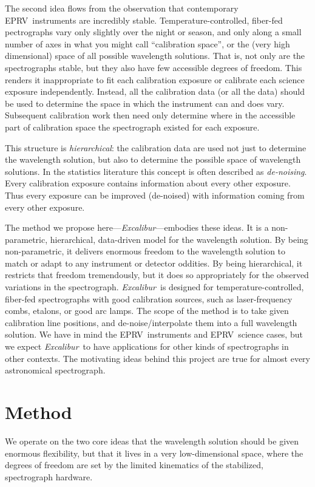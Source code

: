 \documentclass[twocolumn]{aastex63}
\newcommand{\project}[1]{\textsl{#1}}
\newcommand{\name}{\project{Excalibur}}
\newcommand{\acronym}[1]{{\small{#1}}}
\newcommand{\eprv}{\acronym{EPRV}}
\begin{document}
The second idea flows from the observation that contemporary
\eprv\ instruments are incredibly stable.
Temperature-controlled, fiber-fed pectrographs vary only slightly over the night or season, and only along a small number of axes in what you might call ``calibration space'', or the (very high dimensional) space of all possible wavelength solutions.
That is, not only are the spectrographs stable, but they also have few accessible degrees of freedom.
This renders it inappropriate to fit each calibration exposure or calibrate each science exposure independently.
Instead, all the calibration data (or all the data) should be used to determine the space in which the instrument can and does vary.  Subsequent calibration work then need only determine where in the accessible part of calibration space the spectrograph existed for each exposure.

This structure is \emph{hierarchical}: the calibration data are used not just to determine the wavelength solution, but also to determine the possible space of wavelength solutions.
In the statistics literature this concept is often described as \emph{de-noising}.  
Every calibration exposure contains information about every other exposure.  Thus every exposure can be improved (de-noised) with information coming from every other exposure.

The method we propose here---\name---embodies these ideas.
It is a non-parametric, hierarchical, data-driven model for the wavelength solution.
By being non-parametric, it delivers enormous freedom to the wavelength solution to match or adapt to any instrument or detector oddities.
By being hierarchical, it restricts that freedom tremendously, but it does so appropriately for the observed variations in the spectrograph.
\name\ is designed for temperature-controlled, fiber-fed spectrographs with good calibration sources, such as laser-frequency combs, etalons, or good arc lamps.  The scope of the method is to take given calibration line positions, and de-noise/interpolate them into a full wavelength solution.
We have in mind the \eprv\ instruments and \eprv\ science cases, but we expect \name\ to have applications for other kinds of spectrographs in other contexts.  The motivating ideas behind this project are true for almost every astronomical spectrograph.

\section{Method} \label{sec:method}
We operate on the two core ideas that the wavelength solution should be given enormous flexibility, but that it lives in a very low-dimensional space, where the degrees of freedom are set by the limited kinematics of the stabilized, spectrograph hardware.
\end{document}

